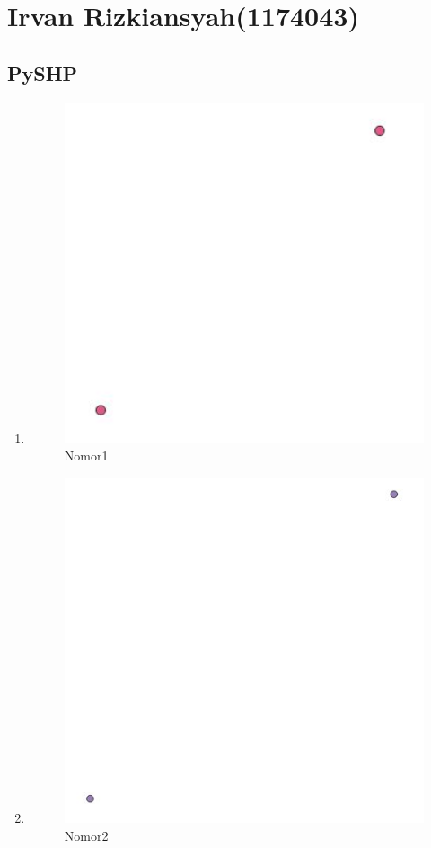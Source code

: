 \section{Irvan Rizkiansyah(1174043)}
	\subsection{PySHP}
		\begin{enumerate}
			\item 
				
				\begin{figure}[H]
					\includegraphics[width=12cm]{figures/1174043/1.jpg}
					\centering
					\caption{Nomor1}
				\end{figure}
			
			\item 
				
				\begin{figure}[H]
					\includegraphics[width=12cm]{figures/1174043/2.jpg}
					\centering
					\caption{Nomor2}
				\end{figure}
			

\end{enumerate}
